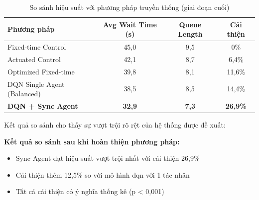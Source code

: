 \begin{table}[!htp]
    \centering
    \caption{So sánh hiệu suất với phương pháp truyền thống (giai đoạn cuối)}
    \label{tab:traditional_comparison}
    \begin{tabular}{@{}lccc@{}}
        \toprule \textbf{Phương pháp} & \textbf{Avg Wait Time (s)} & \textbf{Queue Length}  & \textbf{Cải thiện}      \\
        \midrule Fixed-time Control   & 45,0                       & 9,5                    & 0\%                      \\
        Actuated Control              & 42,1                       & 8,7                    & 6,4\%                   \\
        Optimized Fixed-time          & 39,8                       & 8,1                    & 11,6\%                  \\
        DQN Single Agent (Balanced)   & 38,5                       & 8,5                    & 14,4\%                  \\
        \textbf{DQN + Sync Agent}     & \textbf{32,9}              & \textbf{7,3}           & \textbf{26,9\%}         \\
        \bottomrule
    \end{tabular}
\end{table}

Kết quả so sánh cho thấy sự vượt trội rõ rệt của hệ thống được đề xuất:

\textbf{Kết quả so sánh sau khi hoàn thiện phương pháp:}
\begin{itemize}
    \item Sync Agent đạt hiệu suất vượt trội nhất với cải thiện 26,9\% 
    \item Cải thiện thêm 12,5\% so với mô hình \ac{dqn} với 1 tác nhân
    \item Tất cả cải thiện có ý nghĩa thống kê (p < 0,001)
\end{itemize}



    
